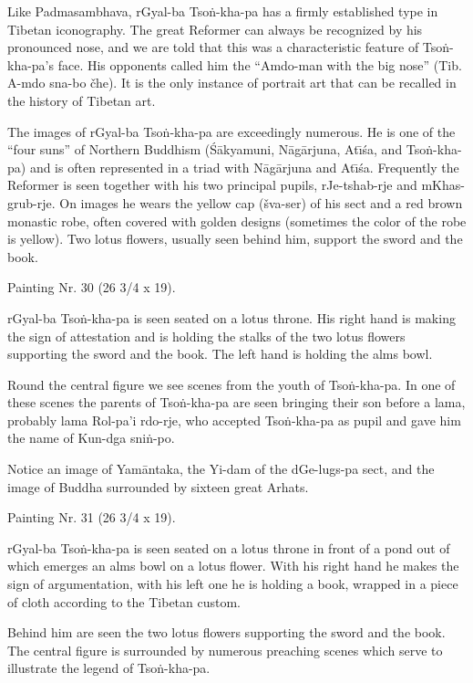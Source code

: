 \documentclass[a4paper, 12pt, oneside]{article}
\begin{document}
Like Padmasambhava, rGyal-ba Tso\.{n}-kha-pa has a firmly established type in Tibetan iconography. The great Reformer can always be recognized by his pronounced nose, and we are told that this was a characteristic feature of Tso\.{n}-kha-pa's face. His opponents called him the ``Amdo-man with the big nose'' (Tib. A-mdo sna-bo čhe). It is the only instance of portrait art that can be recalled in the history of Tibetan art.

The images of rGyal-ba Tso\.{n}-kha-pa are exceedingly numerous. He is one of the ``four suns'' of Northern Buddhism (\'{S}\={a}kyamuni, N\={a}g\={a}rjuna, At\={\i}\'{s}a, and Tso\.{n}-kha-pa) and is often represented in a triad with N\={a}g\={a}rjuna and At\={\i}\'{s}a. Frequently the Reformer is seen together with his two principal pupils, rJe-tshab-rje and mKhas-grub-rje. On images he wears the yellow cap (šva-ser) of his sect and a red brown monastic robe, often covered with golden designs (sometimes the color of the robe is yellow). Two lotus flowers, usually seen behind him, support the sword and the book.

\bigskip

Painting Nr. 30 (26 3/4 x 19).

\bigskip

rGyal-ba Tso\.{n}-kha-pa is seen seated on a lotus throne. His right hand is making the sign of attestation and is holding the stalks of the two lotus flowers supporting the sword and the book. The left hand is holding the alms bowl.

Round the central figure we see scenes from the youth of Tso\.{n}-kha-pa. In one of these scenes the parents of Tso\.{n}-kha-pa are seen bringing their son before a lama, probably lama Rol-pa'i rdo-rje, who accepted Tso\.{n}-kha-pa as pupil and gave him the name of Kun-dga sni\.{n}-po.

Notice an image of Yam\={a}ntaka, the Yi-dam of the dGe-lugs-pa sect, and the image of Buddha surrounded by sixteen great Arhats.

\bigskip

Painting Nr. 31 (26 3/4 x 19).

\bigskip

rGyal-ba Tso\.{n}-kha-pa is seen seated on a lotus throne in front of a pond out of which emerges an alms bowl on a lotus flower. With his right hand he makes the sign of argumentation, with his left one he is holding a book, wrapped in a piece of cloth according to the Tibetan custom.

Behind him are seen the two lotus flowers supporting the sword and the book. The central figure is surrounded by numerous preaching scenes which serve to illustrate the legend of Tso\.{n}-kha-pa.
\end{document}
